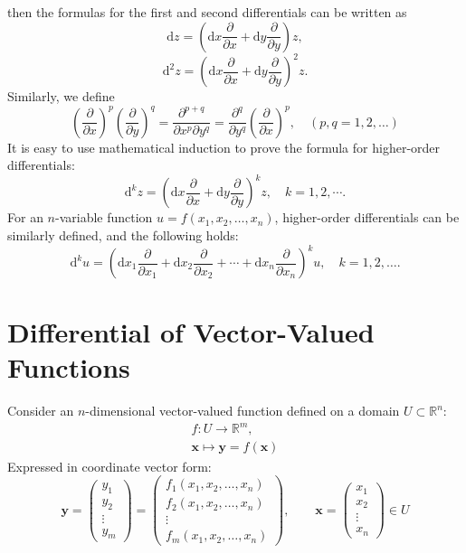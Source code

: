 \documentclass[11pt]{elegantbook}
\begin{document}
then the formulas for the first and second differentials can be written as
\[
    \mathrm{d}z = \left( \mathrm{d}x \frac{\partial}{\partial x} + \mathrm{d}y \frac{\partial}{\partial y} \right) z,
\]
\[
    \mathrm{d}^2 z = \left( \mathrm{d}x \frac{\partial}{\partial x} + \mathrm{d}y \frac{\partial}{\partial y} \right)^2 z.
\]
Similarly, we define
\[
    \left( \frac{\partial}{\partial x} \right)^p
    \left( \frac{\partial}{\partial y} \right)^q
    = \frac{\partial^{p+q}}{\partial x^p \partial y^q}
    = \frac{\partial^q}{\partial y^q}
    \left( \frac{\partial}{\partial x} \right)^p,
    \quad (p, q = 1, 2, \dots)
\]
It is easy to use mathematical induction to prove the formula for higher-order differentials:
\[
    \mathrm{d}^k z = \left( \mathrm{d}x \frac{\partial}{\partial x} + \mathrm{d}y \frac{\partial}{\partial y} \right)^k z, 
    \quad k = 1, 2, \cdots.
\]
For an \( n \)-variable function \( u = f(x_1, x_2, \dots, x_n) \), higher-order differentials can be similarly defined, and the following holds:
\[
    \mathrm{d}^k u 
    = \left( \mathrm{d}x_1 \frac{\partial}{\partial x_1} + \mathrm{d}x_2 \frac{\partial}{\partial x_2} 
    + \cdots + \mathrm{d}x_n \frac{\partial}{\partial x_n} \right)^k u, \quad k = 1, 2, \dots.
\]



\section{Differential of Vector-Valued Functions}
Consider an $n$-dimensional vector-valued function defined on a domain $U \subset \mathbb{R}^n$:
\begin{gather*}
    f: U \to \mathbb{R}^m, \\ 
    \mathbf{x} \mapsto \mathbf{y} = f(\mathbf{x})
\end{gather*}
Expressed in coordinate vector form:
\[
    \mathbf{y} =
    \begin{pmatrix}
    y_1 \\ y_2 \\ \vdots \\ y_m
    \end{pmatrix}
    =
    \begin{pmatrix}
    f_1(x_1, x_2, \dots, x_n) \\
    f_2(x_1, x_2, \dots, x_n) \\
    \vdots \\
    f_m(x_1, x_2, \dots, x_n)
    \end{pmatrix},
    \qquad \mathbf{x} = \begin{pmatrix} 
    x_1 \\ x_2 \\ \vdots \\ x_n 
    \end{pmatrix}  \in U
\]
\end{document}
